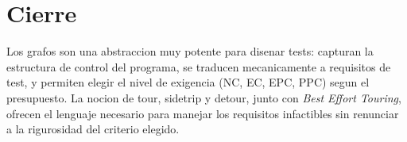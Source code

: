 \documentclass[12pt,a4paper]{article}
\begin{document}
\section*{Cierre}

Los grafos son una abstraccion muy potente para disenar tests: capturan la estructura de control
del programa, se traducen mecanicamente a requisitos de test, y permiten elegir el nivel de
exigencia (NC, EC, EPC, PPC) segun el presupuesto. La nocion de tour, sidetrip y detour, junto
con \textit{Best Effort Touring}, ofrecen el lenguaje necesario para manejar los requisitos
infactibles sin renunciar a la rigurosidad del criterio elegido.
\end{document}
